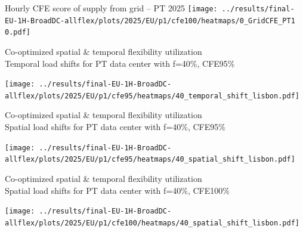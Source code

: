 

\begin{frame}{Hourly CFE score of supply from grid -- PT 2025}
  \vspace{.5cm}
  \texttt{[image: ../results/final-EU-1H-BroadDC-allflex/plots/2025/EU/p1/cfe100/heatmaps/0\_GridCFE\_PT1 0.pdf]}
\end{frame}


\begin{frame}{Co-optimized spatial \& temporal flexibility utilization \\
  Temporal load shifts for PT data center with f=40\%, CFE95\%}

  \vspace{.3cm}
  
  \centering
  \texttt{[image: ../results/final-EU-1H-BroadDC-allflex/plots/2025/EU/p1/cfe95/heatmaps/40\_temporal\_shift\_lisbon.pdf]}

  \vspace{.3cm}

\end{frame}


\begin{frame}{Co-optimized spatial \& temporal flexibility utilization \\
  Spatial load shifts for PT data center with f=40\%, CFE95\%}

  \vspace{.3cm}
  
  \centering
  \texttt{[image: ../results/final-EU-1H-BroadDC-allflex/plots/2025/EU/p1/cfe95/heatmaps/40\_spatial\_shift\_lisbon.pdf]}

  \vspace{.3cm}

\end{frame}


\begin{frame}{Co-optimized spatial \& temporal flexibility utilization \\
  Spatial load shifts for PT data center with f=40\%, CFE100\%}

  \vspace{.3cm}
  
  \centering
  \texttt{[image: ../results/final-EU-1H-BroadDC-allflex/plots/2025/EU/p1/cfe100/heatmaps/40\_spatial\_shift\_lisbon.pdf]}

  \vspace{.3cm}

\end{frame}


